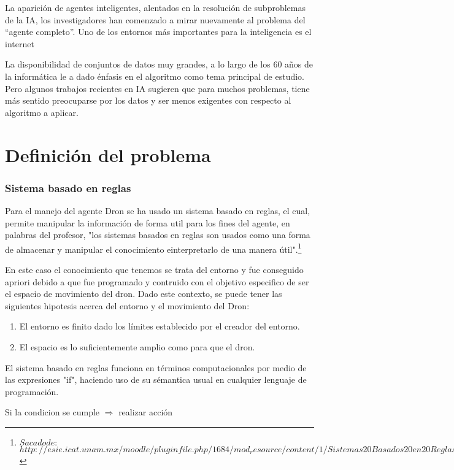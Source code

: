 \documentclass[10pt, a4paper]{article}
\begin{document}
La aparición de agentes inteligentes, alentados en la resolución de subproblemas de la IA, los investigadores han comenzado a mirar nuevamente al problema del “agente completo”.
Uno de los entornos más importantes para la inteligencia es el internet

La disponibilidad de conjuntos de datos muy grandes, a lo largo de los 60 años de la informática le a dado énfasis en el algoritmo como tema principal de estudio. Pero algunos trabajos recientes en IA sugieren que para muchos problemas, tiene más sentido preocuparse por los datos y ser menos exigentes con respecto al algoritmo a aplicar.



\section{Definición del problema}
\subsubsection{Sistema basado en reglas}
Para el manejo del agente Dron se ha usado un sistema basado en reglas, el cual, permite manipular la información de forma util para los fines del agente, en palabras del profesor, "los sistemas basados en reglas son usados como una forma de almacenar y manipular el conocimiento einterpretarlo de una manera útil".\footnote{$ Sacado de: $ \\ $http://esie.icat.unam.mx/moodle/pluginfile.php/1684/mod_resource/content/1/Sistemas20Basados20en20Reglas.pdf$ }

En este caso el conocimiento que tenemos se trata del entorno y fue conseguido apriori  debido a que fue programado y contruido con el objetivo especifico de ser el espacio de movimiento del dron. Dado este contexto, se puede tener las siguientes hipotesis acerca del entorno y el movimiento del Dron:

\begin{enumerate}
\item El entorno es finito dado los límites establecido por el creador del entorno.
\item El espacio es lo suficientemente amplio como para que el dron.
\end{enumerate}

El sistema basado en reglas funciona en términos computacionales por medio de las expresiones "if", haciendo uso de su sémantica usual en cualquier lenguaje de programación.

Si la condicion se cumple $\Rightarrow$ realizar acción
\end{document}
